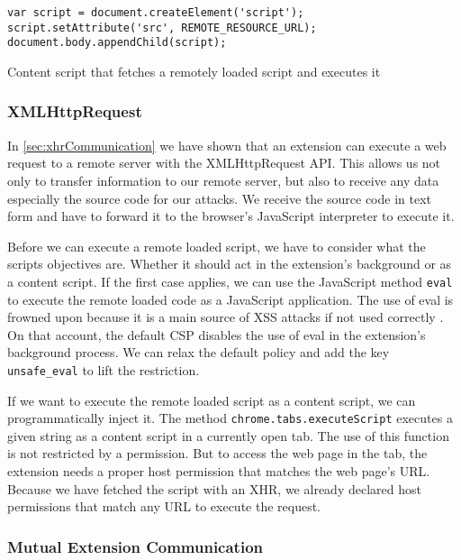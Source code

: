 	\begin{code}
		\begin{lstlisting}
var script = document.createElement('script');
script.setAttribute('src', REMOTE_RESOURCE_URL);
document.body.appendChild(script);
\end{lstlisting}
		\caption{Content script that fetches a remotely loaded script and executes it}
		\label{code:loadScriptWithScriptElement}
	\end{code}
	
\subsubsection{XMLHttpRequest}

	In \autoref{sec:xhrCommunication} we have shown that an extension can execute a web request to a remote server with the XMLHttpRequest API. This allows us not only to transfer information to our remote server, but also to receive any data especially the source code for our attacks. We receive the source code in text form and have to forward it to the browser's JavaScript interpreter to execute it.
	
	Before we can execute a remote loaded script, we have to consider what the scripts objectives are. Whether it should act in the extension's background or as a content script. If the first case applies, we can use the JavaScript method \texttt{eval} to execute the remote loaded code as a JavaScript application. The use of eval is frowned upon because it is a main source of XSS attacks if not used correctly \cite{mozillaDangerousEval}. On that account, the default CSP disables the use of eval in the extension's background process. We can relax the default policy and add the key \texttt{unsafe\_eval} to lift the restriction. 
	
	If we want to execute the remote loaded script as a content script, we can programmatically inject it. The method \texttt{chrome.tabs.executeScript} executes a given string as a content script in a currently open tab. The use of this function is not restricted by a permission. But to access the web page in the tab, the extension needs a proper host permission that matches the web page's URL. Because we have fetched the script with an XHR, we already declared host permissions that match any URL to execute the request.
	
\subsubsection{Mutual Extension Communication}

